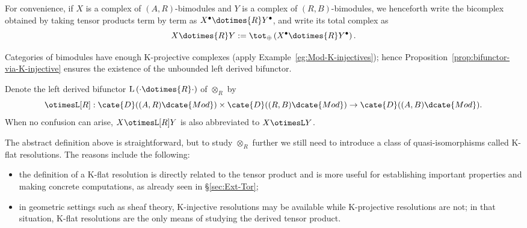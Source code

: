 For convenience, if $X$ is a complex of $(A,R)$-bimodules and $Y$ is a
complex of $(R,B)$-bimodules, we henceforth write the bicomplex obtained by
taking tensor products term by term as
$X^\bullet\dotimes{R}Y^\bullet$, and write its total complex as
\[ X \dotimes{R} Y := \tot_{\oplus} \left( X^\bullet \dotimes{R} Y^\bullet \right). \]

Categories of bimodules have enough K-projective complexes (apply
Example~\ref{eg:Mod-K-injectives}); hence
Proposition~\ref{prop:bifunctor-via-K-injective} ensures the existence of the
unbounded left derived bifunctor.

\begin{definition}\label{def:otimesL}
	Denote the left derived bifunctor
	$\mathrm{L}\left(\cdot\dotimes{R}\cdot\right)$ of $\otimes_R$ by
	\[ \otimesL[R] : \cate{D}((A, R)\dcate{Mod}) \times \cate{D}((R, B)\dcate{Mod}) \to \cate{D}((A, B)\dcate{Mod}). \]
	When no confusion can arise, $X\otimesL[R]Y$ is also abbreviated to
	$X\otimesL Y$.
\end{definition}

The abstract definition above is straightforward, but to study $\otimes_R$
further we still need to introduce a class of quasi-isomorphisms called K-flat
resolutions. The reasons include the following:
\begin{itemize}
	\item the definition of a K-flat resolution is directly related to the tensor
	product and is more useful for establishing important properties and making
	concrete computations, as already seen in \S\ref{sec:Ext-Tor};
	\item in geometric settings such as sheaf theory, K-injective resolutions
	may be available while K-projective resolutions are not; in that situation,
	K-flat resolutions are the only means of studying the derived tensor product.
\end{itemize}

